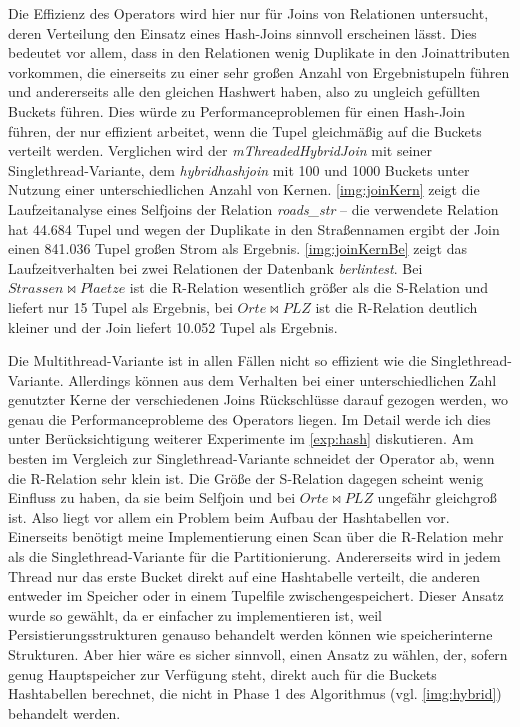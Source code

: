 \documentclass[a4paper,12pt,twoside]{article}
\newcommand{\Fb}[1]{\textit{#1}} %
\begin{document}
Die Effizienz des Operators wird hier nur für Joins von Relationen untersucht, deren Verteilung den Einsatz eines Hash-Joins sinnvoll erscheinen lässt. Dies bedeutet vor allem, dass in den Relationen wenig Duplikate in den Joinattributen vorkommen, die einerseits zu einer sehr großen Anzahl von Ergebnistupeln führen und andererseits alle den gleichen Hashwert haben, also zu ungleich gefüllten Buckets führen. Dies würde zu Performanceproblemen für einen Hash-Join führen, der nur effizient arbeitet, wenn die Tupel gleichmäßig auf die Buckets verteilt werden. Verglichen wird der \Fb{mThreadedHybridJoin} mit seiner Singlethread-Variante, dem \Fb{hybridhashjoin} mit 100 und 1000 Buckets unter Nutzung einer unterschiedlichen Anzahl von Kernen. \autoref{img:joinKern} zeigt die Laufzeitanalyse eines Selfjoins der Relation \Fb{roads\_str} -- die verwendete Relation hat 44.684 Tupel und wegen der Duplikate in den Straßennamen ergibt der Join einen 841.036 Tupel großen Strom als Ergebnis. \autoref{img:joinKernBe} zeigt das Laufzeitverhalten bei zwei Relationen der Datenbank \Fb{berlintest}. Bei $Strassen \bowtie Plaetze$ ist die R-Relation wesentlich größer als die S-Relation und liefert nur 15 Tupel als Ergebnis, bei $Orte \bowtie PLZ$ ist die R-Relation deutlich kleiner und der Join liefert 10.052 Tupel als Ergebnis.

Die Multithread-Variante ist in allen Fällen nicht so effizient wie die Singlethread-Variante. Allerdings können aus dem Verhalten bei einer unterschiedlichen Zahl genutzter Kerne der verschiedenen Joins Rückschlüsse darauf gezogen werden, wo genau die Performanceprobleme des Operators liegen. Im Detail werde ich dies unter Berücksichtigung weiterer Experimente im \autoref{exp:hash} diskutieren. Am besten im Vergleich zur Singlethread-Variante schneidet der Operator ab, wenn die R-Relation sehr klein ist. Die Größe der S-Relation dagegen scheint wenig Einfluss zu haben, da sie beim Selfjoin und bei $Orte \bowtie PLZ$ ungefähr gleichgroß ist. Also liegt vor allem ein Problem beim Aufbau der Hashtabellen vor. Einerseits benötigt meine Implementierung einen Scan über die R-Relation mehr als die Singlethread-Variante für die Partitionierung. Andererseits wird in jedem Thread nur das erste Bucket direkt auf eine Hashtabelle verteilt, die anderen entweder im Speicher oder in einem Tupelfile zwischengespeichert. Dieser Ansatz wurde so gewählt, da er einfacher zu implementieren ist, weil Persistierungsstrukturen genauso behandelt werden können wie speicherinterne Strukturen. Aber hier wäre es sicher sinnvoll, einen Ansatz zu wählen, der, sofern genug Hauptspeicher zur Verfügung steht, direkt auch für die Buckets Hashtabellen berechnet, die nicht in Phase 1 des Algorithmus (vgl. \autoref{img:hybrid}) behandelt werden. 
\end{document}
